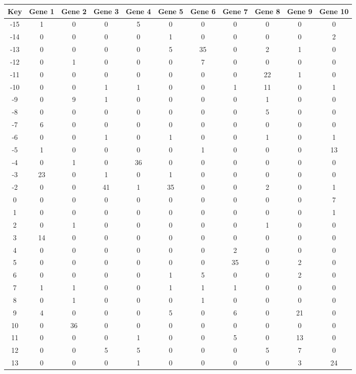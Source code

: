 \begin{tabular}{|c|c|c|c|c|c|c|c|c|c|c|}
\hline
Key & Gene 1 & Gene 2 & Gene 3 & Gene 4 & Gene 5 & Gene 6 & Gene 7 & Gene 8 & Gene 9 & Gene 10 \\
\hline
-15 & 1 & 0 & 0 & 5 & 0 & 0 & 0 & 0 & 0 & 0 \\
-14 & 0 & 0 & 0 & 0 & 1 & 0 & 0 & 0 & 0 & 2 \\
-13 & 0 & 0 & 0 & 0 & 5 & 35 & 0 & 2 & 1 & 0 \\
-12 & 0 & 1 & 0 & 0 & 0 & 7 & 0 & 0 & 0 & 0 \\
-11 & 0 & 0 & 0 & 0 & 0 & 0 & 0 & 22 & 1 & 0 \\
-10 & 0 & 0 & 1 & 1 & 0 & 0 & 1 & 11 & 0 & 1 \\
-9 & 0 & 9 & 1 & 0 & 0 & 0 & 0 & 1 & 0 & 0 \\
-8 & 0 & 0 & 0 & 0 & 0 & 0 & 0 & 5 & 0 & 0 \\
-7 & 6 & 0 & 0 & 0 & 0 & 0 & 0 & 0 & 0 & 0 \\
-6 & 0 & 0 & 1 & 0 & 1 & 0 & 0 & 1 & 0 & 1 \\
-5 & 1 & 0 & 0 & 0 & 0 & 1 & 0 & 0 & 0 & 13 \\
-4 & 0 & 1 & 0 & 36 & 0 & 0 & 0 & 0 & 0 & 0 \\
-3 & 23 & 0 & 1 & 0 & 1 & 0 & 0 & 0 & 0 & 0 \\
-2 & 0 & 0 & 41 & 1 & 35 & 0 & 0 & 2 & 0 & 1 \\
0 & 0 & 0 & 0 & 0 & 0 & 0 & 0 & 0 & 0 & 7 \\
1 & 0 & 0 & 0 & 0 & 0 & 0 & 0 & 0 & 0 & 1 \\
2 & 0 & 1 & 0 & 0 & 0 & 0 & 0 & 1 & 0 & 0 \\
3 & 14 & 0 & 0 & 0 & 0 & 0 & 0 & 0 & 0 & 0 \\
4 & 0 & 0 & 0 & 0 & 0 & 0 & 2 & 0 & 0 & 0 \\
5 & 0 & 0 & 0 & 0 & 0 & 0 & 35 & 0 & 2 & 0 \\
6 & 0 & 0 & 0 & 0 & 1 & 5 & 0 & 0 & 2 & 0 \\
7 & 1 & 1 & 0 & 0 & 1 & 1 & 1 & 0 & 0 & 0 \\
8 & 0 & 1 & 0 & 0 & 0 & 1 & 0 & 0 & 0 & 0 \\
9 & 4 & 0 & 0 & 0 & 5 & 0 & 6 & 0 & 21 & 0 \\
10 & 0 & 36 & 0 & 0 & 0 & 0 & 0 & 0 & 0 & 0 \\
11 & 0 & 0 & 0 & 1 & 0 & 0 & 5 & 0 & 13 & 0 \\
12 & 0 & 0 & 5 & 5 & 0 & 0 & 0 & 5 & 7 & 0 \\
13 & 0 & 0 & 0 & 1 & 0 & 0 & 0 & 0 & 3 & 24 \\
\hline
\end{tabular}